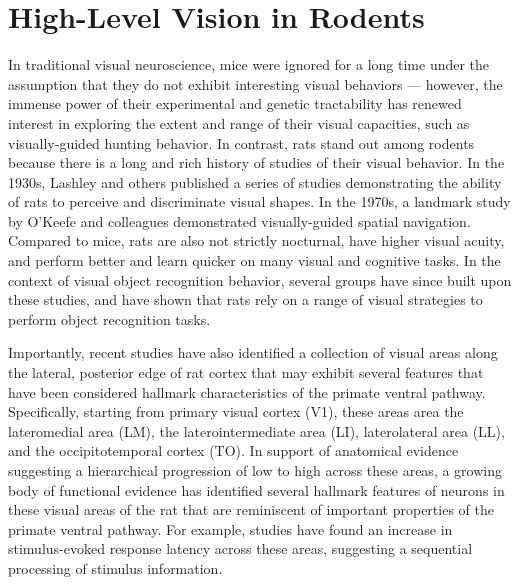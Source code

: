 \section{High-Level Vision in Rodents}
In traditional visual neuroscience, mice were ignored for a long time under the assumption that they do not exhibit interesting visual behaviors --- however, the immense power of their experimental and genetic tractability has renewed interest in exploring the extent and range of their visual capacities, such as visually-guided hunting behavior\cite{Hoy2016, Meyer2020, Michaiel2020}. In contrast, rats stand out among rodents because there is a long and rich history of studies of their visual behavior. In the 1930s, Lashley and others published a series of studies demonstrating the ability of rats to perceive and discriminate visual shapes\cite{Lashley1912, Lashley1930a, Lashley1938}. In the 1970s, a landmark study by O'Keefe and colleagues demonstrated visually-guided spatial navigation\cite{OKeefe1971}. Compared to mice, rats are also not strictly nocturnal, have higher visual acuity\cite{Prusky2000}, and perform better and learn quicker on many visual and cognitive tasks\cite{Whishaw1995}. In the context of visual object recognition behavior, several groups have since built upon these studies, and have shown that rats rely on a range of visual strategies to perform object recognition tasks\cite{Zoccolan2009, Tafazoli2012, Vermaercke2012, Alemi-Neissi2013, Vinken2014}.

Importantly, recent studies have also identified a collection of visual areas along the lateral, posterior edge of rat cortex that may exhibit several features that have been considered hallmark characteristics of the primate ventral pathway. Specifically, starting from primary visual cortex (V1), these areas area the lateromedial area (LM), the laterointermediate area (LI), laterolateral area (LL), and the occipitotemporal
cortex (TO). In support of anatomical evidence suggesting a hierarchical progression of low to high across these areas\cite{Coogan1993, Wang2012NetworkCortex, DSouza2020}, a growing body of functional evidence has identified several hallmark features of neurons in these visual areas of the rat that are reminiscent of important properties of the primate ventral pathway. For example, studies have found an increase in stimulus-evoked response latency across these areas\cite{Vermaercke2014, DSouza2020}, suggesting a sequential processing of stimulus information.

